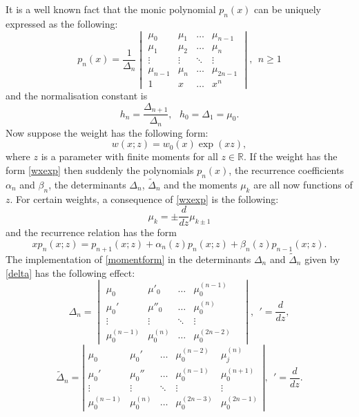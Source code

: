 \documentclass[12pt]{article}
\def\R{\mathbb{R}}
\numberwithin{figure}{section}
\numberwithin{equation}{section}
\numberwithin{table}{section}
\begin{document}
It is a well known fact that the monic polynomial $p_n(x)$ can be uniquely expressed as the following:
\begin{equation}p_n(x)=\frac{1}{\Delta_n}
 \begin{vmatrix}
\mu_{0} & \mu_1  &\hdots& \mu_{n-1} \\
\mu_1 & \mu_2  &\hdots& \mu_{n}   \\
\vdots &\vdots  & \ddots & \vdots \\
\mu_{n-1} & \mu_n  &\hdots& \mu_{2n-1}  \\
1 & x  &\hdots & x^n
 \end{vmatrix},~~n\geq1
\end{equation}
and the normalisation constant is
$$h_n=\frac{\Delta_{n+1}}{\Delta_n},~~~h_0=\Delta_1=\mu_0.$$
Now suppose the weight has the following form:
\begin{equation}
w(x;z)=w_0(x)\exp(xz),\label{wxexp}
\end{equation}
where $z$ is a parameter with finite moments for all $z\in\R$. If the weight has the form \eqref{wxexp} then suddenly the polynomials $p_n(x)$, the recurrence coefficients $\alpha_n$ and $\beta_n$, the determinants $\Delta_n$, $\widetilde\Delta_n$ and the moments $\mu_k$ are all now functions of $z$. For certain weights, a consequence of \eqref{wxexp} is the following:
\begin{equation}
\mu_k=\pm\frac{d}{dz}\mu_{k\pm1}\label{momentform}
\end{equation}
and the recurrence relation has the form
\begin{equation}
xp_n(x;z)=p_{n+1}(x;z)+\alpha_n(z)p_n(x;z)+\beta_n(z)p_{n-1}(x;z).\label{rr}
\end{equation}
The implementation of \eqref{momentform} in the determinants $\Delta_n$ and $\widetilde\Delta_n$ given by \eqref{delta} has the following effect:
\[\Delta_n=
\begin{vmatrix}
\mu_{0} & \mu'_0  &\hdots& \mu_0^{(n-1)} \\
\mu_0' & \mu''_0  &\hdots& \mu_0^{(n)}  \\
\vdots &\vdots  & \ddots &\vdots & \\
\mu_0^{(n-1)} & \mu_0^{(n)} &\hdots& \mu_0^{(2n-2)}
\end{vmatrix},~~'=\frac{d}{dz},
\]
\[
\widetilde\Delta_n=\left|
\begin{array}{ccccc}
\mu_{0} & \mu_{0}'  &\hdots& \mu_{0}^{(n-2)} & \mu_{j}^{(n)} \\
\mu_{0}' & \mu_{0}''  &\hdots& \mu_{0}^{(n-1)} & \mu_{0}^{(n+1)}  \\
\vdots &\vdots  & \ddots &\vdots &\vdots \\
\mu_{0}^{(n-1)} & \mu_{0}^{(n)}  &\hdots& \mu_{0}^{(2n-3)} & \mu_{0}^{(2n-1)}
\end{array}
\right|,~~'=\frac{d}{dz}.\]
\end{document}
